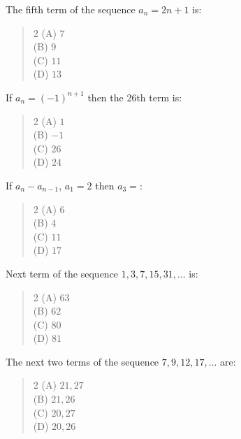 \documentclass[11pt,a4paper]{article}
\begin{document}
\begin{mcqlist}
\item The fifth term of the sequence $a_n=2n+1$ is:
\begin{quote}\begin{multicols}{2}
\noindent (A) $7$ \\
(B) $9$ \\
(C) $11$ \\
(D) $13$
\end{multicols}\end{quote}

\item If $a_n=(-1)^{n+1}$ then the 26th term is:
\begin{quote}\begin{multicols}{2}
\noindent (A) $1$ \\
(B) $-1$ \\
(C) $26$ \\
(D) $24$
\end{multicols}\end{quote}

\item If $a_n-a_{n-1}$, $a_1=2$ then $a_3=$:
\begin{quote}\begin{multicols}{2}
\noindent (A) $6$ \\
(B) $4$ \\
(C) $11$ \\
(D) $17$
\end{multicols}\end{quote}

\item Next term of the sequence $1,3,7,15,31,\ldots$ is:
\begin{quote}\begin{multicols}{2}
\noindent (A) $63$ \\
(B) $62$ \\
(C) $80$ \\
(D) $81$
\end{multicols}\end{quote}

\item The next two terms of the sequence $7,9,12,17,\ldots$ are:
\begin{quote}\begin{multicols}{2}
\noindent (A) $21,27$ \\
(B) $21,26$ \\
(C) $20,27$ \\
(D) $20,26$
\end{multicols}\end{quote}


\end{mcqlist}
\end{document}
